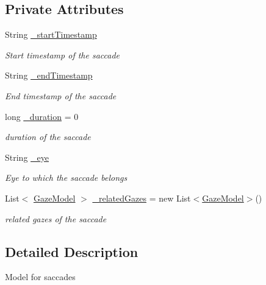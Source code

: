 \subsection*{Private Attributes}
\begin{DoxyCompactItemize}
\item 
String \hyperlink{class_web_analyzer_1_1_models_1_1_analysis_model_1_1_saccade_model_aba79dc37019465bcc958062438713351}{\+\_\+start\+Timestamp}
\begin{DoxyCompactList}\small\item\em Start timestamp of the saccade \end{DoxyCompactList}\item 
String \hyperlink{class_web_analyzer_1_1_models_1_1_analysis_model_1_1_saccade_model_a30104f011f5c5d49a6a3df6343dc8fd8}{\+\_\+end\+Timestamp}
\begin{DoxyCompactList}\small\item\em End timestamp of the saccade \end{DoxyCompactList}\item 
long \hyperlink{class_web_analyzer_1_1_models_1_1_analysis_model_1_1_saccade_model_a702f475b5c253e0af654a3d5d38324db}{\+\_\+duration} = 0
\begin{DoxyCompactList}\small\item\em duration of the saccade \end{DoxyCompactList}\item 
String \hyperlink{class_web_analyzer_1_1_models_1_1_analysis_model_1_1_saccade_model_ad26094ad3aa83c781182f2bce5d0fb13}{\+\_\+eye}
\begin{DoxyCompactList}\small\item\em Eye to which the saccade belongs \end{DoxyCompactList}\item 
List$<$ \hyperlink{class_web_analyzer_1_1_models_1_1_data_model_1_1_gaze_model}{Gaze\+Model} $>$ \hyperlink{class_web_analyzer_1_1_models_1_1_analysis_model_1_1_saccade_model_aaa7e07a49ff69d723d0098ea49d02a0a}{\+\_\+related\+Gazes} = new List$<$\hyperlink{class_web_analyzer_1_1_models_1_1_data_model_1_1_gaze_model}{Gaze\+Model}$>$()
\begin{DoxyCompactList}\small\item\em related gazes of the saccade \end{DoxyCompactList}\end{DoxyCompactItemize}


\subsection{Detailed Description}
Model for saccades 



